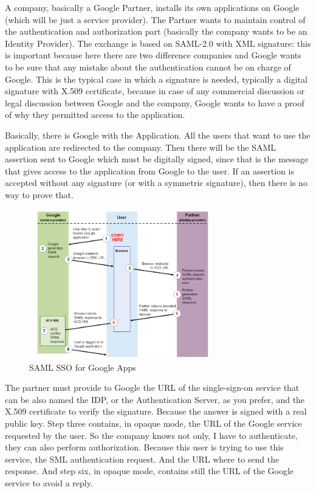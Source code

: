 A company, basically a Google Partner, installs its own applications
on Google (which will be just a service provider). The Partner wants
to maintain control of the authentication and authorization part
(basically the company wants to be an Identity Provider). The exchange
is based on SAML-2.0 with XML signature: this is important because
here there are two difference companies and Google wants to be sure
that any mistake about the authentication cannot be on charge of
Google. This is the typical case in which a signature is needed,
typically a digital signature with X.509 certificate, because in case
of any commercial discussion or legal discussion between Google and
the company, Google wants to have a proof of why they permitted access
to the application.

Basically, there is Google with the Application. All the users that
want to use the application are redirected to the company. Then there
will be the SAML assertion sent to Google which must be digitally
signed, since that is the message that gives access to the application
from Google to the user. If an assertion is accepted without any
signature (or with a symmetric signature), then there is no way to
prove that.

\begin{figure}[H]
  \centering
  \includegraphics[width=0.7\textwidth]{img/google sso.png}
  \caption{SAML SSO for Google Apps}
\end{figure}

The partner must provide to Google the URL of the single-sign-on
service that can be also named the IDP, or the Authentication Server,
as you prefer, and the X.509 certificate to verify the signature.
Because the answer is signed with a real public key. Step three
contains, in opaque mode, the URL of the Google service requested by
the user. So the company knows not only, I have to authenticate, they
can also perform authorization. Because this user is trying to use
this service, the SML authentication request. And the URL where to
send the response. And step six, in opaque mode, contains still the
URL of the Google service to avoid a reply.
  
